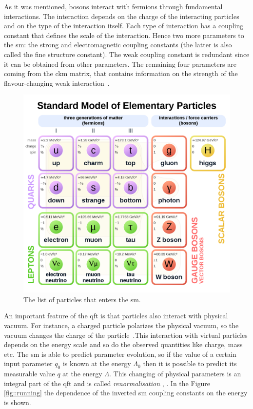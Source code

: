 	As it was mentioned, bosons interact with fermions through fundamental interactions. The interaction depends on the charge of the interacting particles and on the type of the interaction itself. Each type of interaction has a coupling constant that defines the scale of the interaction. Hence two more parameters to the \gls{sm}: the strong and electromagnetic coupling constants (the latter is also called the fine structure constant). The weak coupling constant is redundant since it can be obtained from other parameters. The remaining four parameters are coming from the \gls{ckm} matrix, that contains information on the strength of the flavour-changing weak interaction~\cite{PhysRevD.86.010001}. 
	
	 \begin{figure}[htpb]
		\includegraphics[width=\textwidth,keepaspectratio]{SMwiki.png}
		\caption{The list of particles that enters the \gls{sm}\cite{sm_wiki}. }
		\label{fig::SMwiki}
	\end{figure}
		
An important feature of the \gls{qft} is that particles also interact with physical vacuum. For instance, a charged particle polarizes the physical vacuum, so the vacuum changes the charge of the particle~\cite{Schwinger_polariz}.This interaction with virtual particles depends on the energy scale and so do the observed quantities like charge, mass etc. The \gls{sm} is able to predict parameter evolution, so if the value of a certain input parameter $q_0$ is known at the energy $\Lambda_0$ then it is possible to predict its measurable value $q$ at the energy $\Lambda$. This changing of physical parameters is an integral part of the \gls{qft} and is called \textit{renormalisation} \cite{bogol}, \cite{Glashow:1959wxa}. In the Figure \ref{fig::running} the dependence of the inverted \gls{sm} coupling constants on the energy is shown. 

